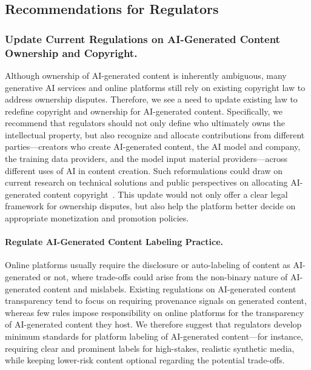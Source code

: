 \subsection{Recommendations for Regulators}
\subsubsection{Update Current Regulations on AI-Generated Content Ownership and Copyright.} Although ownership of AI-generated content is inherently ambiguous, many generative AI services and online platforms still rely on existing copyright law to address ownership disputes. Therefore, we see a need to update existing law to redefine copyright and ownership for AI-generated content. Specifically, we recommend that regulators should not only define who ultimately owns the intellectual property, but also recognize and allocate contributions from different parties---creators who create AI-generated content, the AI model and company, the training data providers, and the model input material providers---across different uses of AI in content creation. Such reformulations could draw on current research on technical solutions and public perspectives on allocating AI-generated content copyright~\cite{10.1145/3715336.3735683, lima2025public}. This update would not only offer a clear legal framework for ownership disputes, but also help the platform better decide on appropriate monetization and promotion policies.

\paragraph{Regulate AI-Generated Content Labeling Practice.} Online platforms usually require the disclosure or auto-labeling of content as AI-generated or not, where trade-offs could arise from the non-binary nature of AI-generated content and mislabels. Existing regulations on AI-generated content transparency tend to focus on requiring provenance signals on generated content, whereas few rules impose responsibility on online platforms for the transparency of AI-generated content they host. We therefore suggest that regulators develop minimum standards for platform labeling of AI-generated content---for instance, requiring clear and prominent labels for high-stakes, realistic synthetic media, while keeping lower-risk content optional regarding the potential trade-offs.

